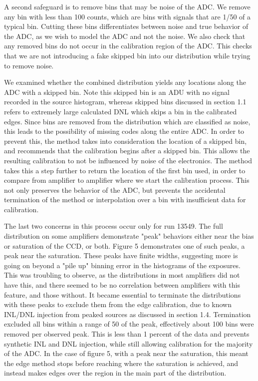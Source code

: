 \documentclass[11pt, letterpaper]{article}
\begin{document}
A second safeguard is to remove bins that may be noise of the ADC. 
We remove any bin with less than 100 counts, which are bins with signals that are 1/50 of a typical bin.
Cutting these bins differentiates between noise and true behavior of the ADC, as we wish to model the ADC and not the noise. 
We also check that any removed bins do not occur in the calibration region of the ADC. 
This checks that we are not introducing a fake skipped bin into our distribution while trying to remove noise. 
\indent


We examined whether the combined distribution yields any locations along the ADC with a skipped bin. 
Note this skipped bin is an ADU with no signal recorded in the source histogram, whereas skipped bins discussed in section 1.1 refers to extremely large calculated DNL which skips a bin in the calibrated edges.
Since bins are removed from the distribution which are classified as noise, this leads to the possibility of missing codes along the entire ADC. 
In order to prevent this, the method takes into consideration the location of a skipped bin, and recommends that the calibration begins after a skipped bin. 
This allows the resulting calibration to not be influenced by noise of the electronics. 
The method takes this a step further to return the location of the first bin used, in order to compare from amplifier to amplifier where we start the calibration process. 
This not only preserves the behavior of the ADC, but prevents the accidental termination of the method or interpolation over a bin with insufficient data for calibration. 
\indent 


The last two concerns in this process occur only for run 13549.  
The full distribution on some amplifiers demonstrate "peak" behaviors either near the bias or saturation of the CCD, or both.
Figure 5 demonstrates one of such peaks, a peak near the saturation.  
These peaks have finite widths, suggesting more is going on beyond a "pile up" binning error in the histograms of the exposures. 
This was troubling to observe, as the distributions in most amplifiers did not have this, and there seemed to be no correlation between amplifiers with this feature, and those without. 
It became essential to terminate the distributions with these peaks to exclude them from the edge calibration, due to known INL/DNL injection from peaked sources as discussed in section 1.4. 
Termination excluded all bins within a range of 50 of the peak, effectively about 100 bins were removed per observed peak. 
This is less than 1 percent of the data and prevents synthetic INL and DNL injection, while still allowing calibration for the majority of the ADC. 
In the case of figure 5, with a peak near the saturation, this meant the edge method stops before reaching where the saturation is achieved, and instead makes edges over the region in the main part of the distribution. 
\indent
\end{document}
